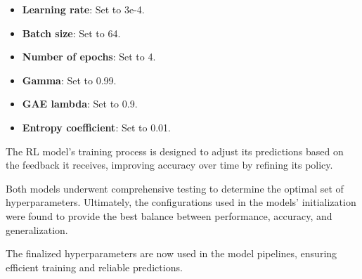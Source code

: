 \begin{itemize}
    \item \textbf{Learning rate}: Set to 3e-4.
    \item \textbf{Batch size}: Set to 64.
    \item \textbf{Number of epochs}: Set to 4.
    \item \textbf{Gamma}: Set to 0.99.
    \item \textbf{GAE lambda}: Set to 0.9.
    \item \textbf{Entropy coefficient}: Set to 0.01.
\end{itemize}

The \gls{RL} model's training process is designed to adjust its predictions based on the feedback it receives, improving accuracy over time by refining its policy.

Both models underwent comprehensive testing to determine the optimal set of hyperparameters. Ultimately, the configurations used in the models' initialization were found to provide the best balance between performance, accuracy, and generalization.

The finalized hyperparameters are now used in the model pipelines, ensuring efficient training and reliable predictions.
